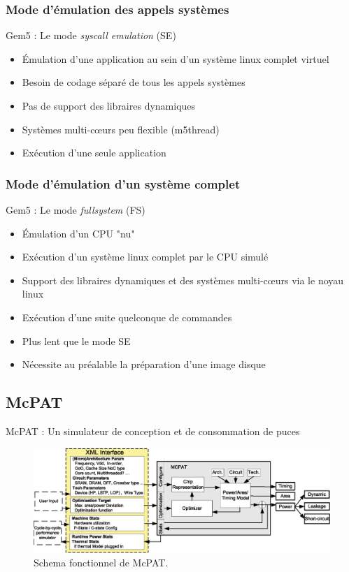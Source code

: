\documentclass{beamer}
\begin{document}
\subsubsection{Mode d'émulation des appels systèmes}
\begin{frame}{Gem5 : Le mode \textit{syscall emulation} (SE)}
\begin{itemize}
\item Émulation d'une application au sein d'un système linux complet virtuel
\medskip
\item Besoin de codage séparé de tous les appels systèmes
\medskip
\item Pas de support des libraires dynamiques
\medskip
\item Systèmes multi-cœurs peu flexible (m5thread)
\medskip
\item Exécution d'une seule application
\end{itemize}
\end{frame}


\subsubsection{Mode d'émulation d'un système complet}
\begin{frame}{Gem5 : Le mode \textit{fullsystem} (FS)}
\begin{itemize}
\item Émulation d'un CPU "nu"
\medskip
\item Exécution d'un système linux complet par le CPU simulé
\medskip
\item Support des libraires dynamiques et des systèmes multi-cœurs via le noyau linux
\medskip
\item Exécution d'une suite quelconque de commandes
\medskip
\item Plus lent que le mode SE
\medskip
\item Nécessite au préalable la préparation d'une image disque
\end{itemize}
\end{frame}


\subsection{McPAT}
\begin{frame}{McPAT : Un simulateur de conception et de consommation de puces}
\begin{figure}[ht]
\begin{center}
\includegraphics[width=0.84\paperwidth]{McPAT_diag.eps}
\caption{\label{McPAT_schema}Schema fonctionnel de McPAT.}
\end{center}
\end{figure}
\end{frame}
\end{document}
